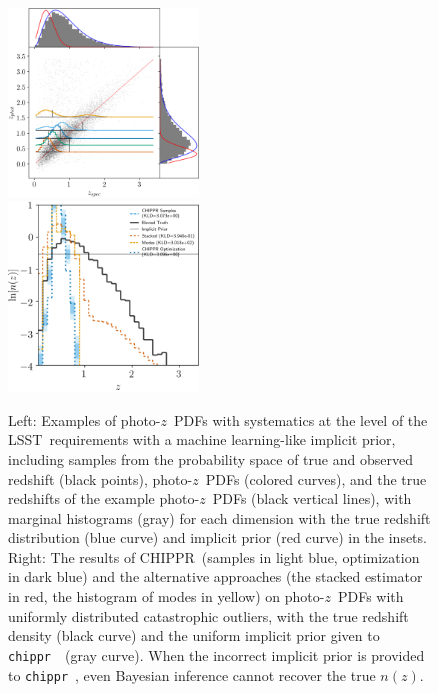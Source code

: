 \documentclass[iop]{emulateapj}
\newcommand{\project}[1]{{\textsc{#1}}}
\newcommand{\lsst}{\project{LSST}}
\newcommand{\Chippr}{\project{CHIPPR}}
\newcommand{\repo}[1]{{\texttt{#1}}~}
\newcommand{\chippr}{\repo{chippr}}
\newcommand{\nz}{$n(z)$}
\newcommand{\pz}{photo-$z$~}
\newcommand{\pzpdf}{\pz PDF}
\begin{document}
\begin{figure}
	\begin{center}
		\includegraphics[width=0.45\textwidth]{figures/chippr/misspecified_mega_scatter.png}\\
		\includegraphics[width=0.45\textwidth]{figures/chippr/misspecified_log_estimators.png}
		\caption{
			Left: Examples of \pzpdf s with systematics at the level of the \lsst\ requirements with a machine learning-like implicit prior, including samples from the probability space of true and observed redshift (black points), \pzpdf s (colored curves), and the true redshifts of the example \pzpdf s (black vertical lines), with marginal histograms (gray) for each dimension with the true redshift distribution (blue curve) and implicit prior (red curve) in the insets.
			Right: The results of \Chippr\ (samples in light blue, optimization in dark blue) and the alternative approaches (the stacked estimator in red, the histogram of modes in yellow) on \pzpdf s with uniformly distributed catastrophic outliers, with the true redshift density (black curve) and the uniform implicit prior given to \chippr\ (gray curve).
			When the incorrect implicit prior is provided to \chippr, even Bayesian inference cannot recover the true \nz.
		}
		\label{fig:mischaracterized}
	\end{center}
\end{figure}
\end{document}

